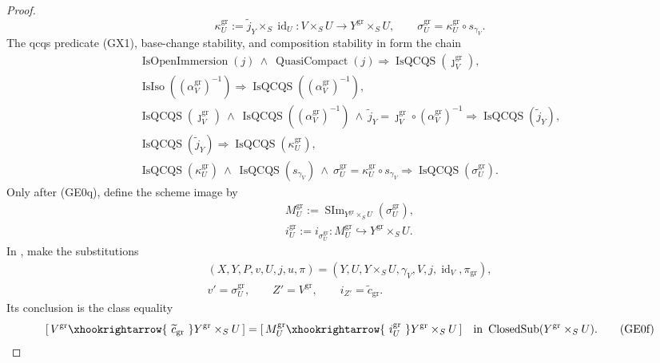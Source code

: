 \begin{proof}
  \[
    \kappa_U^{\mathrm{gr}}:=
      \widetilde j_Y\times_S\operatorname{id}_U
      \colon V\times_SU\to Y^{\mathrm{gr}}\times_SU,
    \qquad
    \sigma_U^{\mathrm{gr}}
      =\kappa_U^{\mathrm{gr}}\circ s_{\gamma_V}.                 \tag{GE0q0}
  \]
  The qcqs predicate (GX1), base-change stability, and composition stability
  in  form the chain
  \[
  \begin{gathered}
    \operatorname{IsOpenImmersion}(j)\ \wedge\
      \operatorname{QuasiCompact}(j)
      \Longrightarrow\operatorname{IsQCQS}(\jmath_V^{\mathrm{gr}}),\\
    \operatorname{IsIso}((\alpha_V^{\mathrm{gr}})^{-1})
      \Longrightarrow\operatorname{IsQCQS}
        ((\alpha_V^{\mathrm{gr}})^{-1}),\\
    \operatorname{IsQCQS}(\jmath_V^{\mathrm{gr}})\ \wedge\
      \operatorname{IsQCQS}((\alpha_V^{\mathrm{gr}})^{-1})\ \wedge\
      \widetilde j_Y
        =\jmath_V^{\mathrm{gr}}\circ(\alpha_V^{\mathrm{gr}})^{-1}
      \Longrightarrow\operatorname{IsQCQS}(\widetilde j_Y),\\
    \operatorname{IsQCQS}(\widetilde j_Y)
      \Longrightarrow\operatorname{IsQCQS}(\kappa_U^{\mathrm{gr}}),\\
    \operatorname{IsQCQS}(\kappa_U^{\mathrm{gr}})\ \wedge\
      \operatorname{IsQCQS}(s_{\gamma_V})\ \wedge\
      \sigma_U^{\mathrm{gr}}
        =\kappa_U^{\mathrm{gr}}\circ s_{\gamma_V}
      \Longrightarrow\operatorname{IsQCQS}(\sigma_U^{\mathrm{gr}}).
  \end{gathered}                                                   \tag{GE0q}
  \]
  Only after (GE0q), define the scheme image by
  \[
  \begin{gathered}
    M_U^{\mathrm{gr}}:=
      \operatorname{SIm}_{Y^{\mathrm{gr}}\times_SU}
        (\sigma_U^{\mathrm{gr}}),\\
    i_U^{\mathrm{gr}}:=i_{\sigma_U^{\mathrm{gr}}}\colon
      M_U^{\mathrm{gr}}\hookrightarrow Y^{\mathrm{gr}}\times_SU.
  \end{gathered} \tag{GE0e}
  \]
  In , make the substitutions
  \[
  \begin{gathered}
    (X,Y,P,v,U,j,u,\pi)
      =(Y,U,Y\times_SU,\gamma_V,V,j,\operatorname{id}_V,
        \pi_{\mathrm{gr}}),\\
    v'=\sigma_U^{\mathrm{gr}},\qquad
    Z'=V^{\mathrm{gr}},\qquad i_{Z'}=\widetilde c_{\mathrm{gr}}.
  \end{gathered}
  \]
  Its conclusion is the class equality
  \[
    [\,V^{\mathrm{gr}}
      \xhookrightarrow{\ \widetilde c_{\mathrm{gr}}\ }
        Y^{\mathrm{gr}}\times_SU\,]
      =[\,M_U^{\mathrm{gr}}
      \xhookrightarrow{\ i_U^{\mathrm{gr}}\ }
        Y^{\mathrm{gr}}\times_SU\,]
      \quad\text{in }\operatorname{ClosedSub}(Y^{\mathrm{gr}}\times_SU).
                                                                    \tag{GE0f}
  \]


\end{proof}
